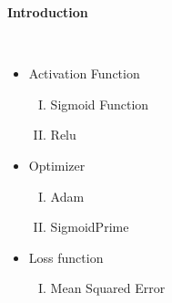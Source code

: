 \documentclass[12pt,a4paper]{article}
\title{}
\author{虎尾科技大學\\40723115\\ 林于哲}
\date{April 1 2021}
\begin{document}
\maketitle
\tableofcontents

\newpage
\begin{huge}\textbf{Introduction}\end{huge}\\
\begin{itemize}
\item Activation Function 
   \begin{enumerate}[I.]
   \item Sigmoid Function
   \item Relu
   \end{enumerate}
\end{itemize}   
\begin{itemize}
\item Optimizer
   \begin{enumerate}[I.]
   \item Adam
   \item SigmoidPrime
   \end{enumerate}
\end{itemize}  
\begin{itemize}   
\item Loss function
   \begin{enumerate}[I.]
   \item Mean Squared Error
   \end{enumerate}
\end{itemize} 
\end{document}
